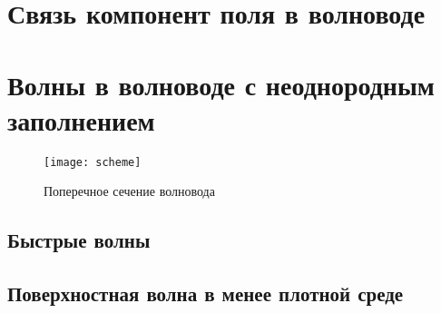 \documentclass[12pt]{hedsemwork}
\begin{document}
\section{Связь компонент поля в волноводе}

\section{Волны в волноводе с неоднородным заполнением}
\begin{figure}[h]
    \center
    \texttt{[image: scheme]}
    \caption{Поперечное сечение волновода}
\end{figure}
\subsection{Быстрые волны}

\subsection{Поверхностная волна в менее плотной среде}

\end{document}
